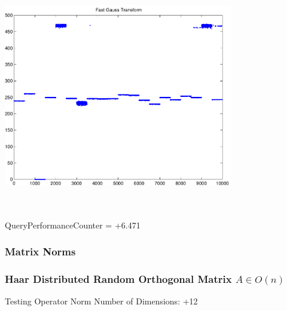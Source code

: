 \documentclass[9pt]{article}
\theoremstyle{plain}
\theoremstyle{definition}
\theoremstyle{remark}
\numberwithin{equation}{section}
\begin{document}
\includegraphics[width=10.0cm,height=10.0cm]{FGT20_Centers.pdf}

QueryPerformanceCounter  =  +6.471
\subsubsection{Matrix Norms}
\subsubsection{Haar Distributed Random Orthogonal Matrix $A \in O(n)$}
 Testing Operator Norm
Number of Dimensions: +12
\end{document}
